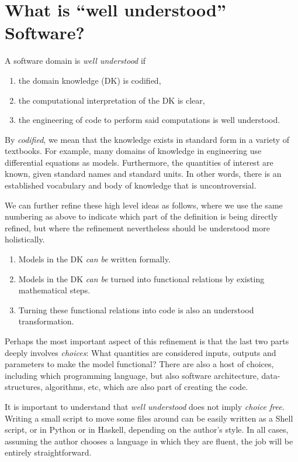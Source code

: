 \documentclass[10pt,twoside,onecolumn,openany,letterpaper]{memoir}
\begin{document}
\chapter{What is ``well understood'' Software?}

\begin{defn}
A software domain is \emph{well understood} if
\begin{enumerate}
\item the domain knowledge (DK) is codified,
\item the computational interpretation of the DK is clear,
\item the engineering of code to perform said computations is well
understood.
\end{enumerate}
\end{defn}

By \emph{codified}, we mean that the knowledge exists in standard form in
a variety of textbooks. For example, many domains of knowledge in engineering
use differential equations as models. Furthermore, the quantities of interest
are known, given standard names and standard units. In other words, there is
an established vocabulary and body of knowledge that is uncontroversial.

We can further refine these high level ideas as follows, where we use
the same numbering as above to indicate which part of the definition is
being directly refined, but where the refinement nevertheless should be
understood more holistically.
\begin{enumerate}
\item Models in the DK \emph{can be} written formally.
\item Models in the DK \emph{can be} turned into functional relations by
 existing mathematical steps.
\item Turning these functional relations into code is also an understood
 transformation.
\end{enumerate}
Perhaps the most important aspect of this refinement is that the last two
parts deeply involves \emph{choices}: What quantities are considered inputs,
outputs and parameters to make the model functional? There are also a host
of choices, including which programming language, but also software
architecture, data-structures, algorithms, etc, which are also part of
creating the code.

It is important to understand that \emph{well understood} does not imply
\emph{choice free}.  Writing a small script to move some files around can
be easily written as a Shell script, or in Python or in Haskell, depending on
the author's style. In all cases, assuming the author chooses a language
in which they are fluent, the job will be entirely straightforward.
\end{document}
